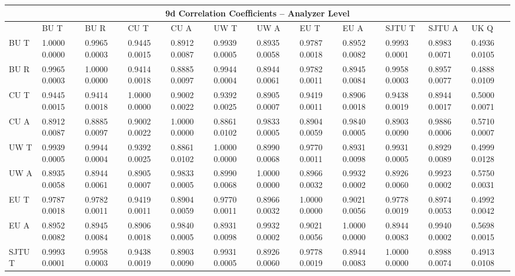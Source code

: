 \begin{landscape}
\begin{table}
\small
\centering
\renewcommand{\arraystretch}{1.5}
\begin{tabularx}{1\linewidth}{@{\extracolsep{\fill}}lXXXXXXXXXXX}
  \toprule
  	\multicolumn{12}{c}{{\normalsize 9d Correlation Coefficients -- Analyzer Level}} \\
  \midrule
  	       & BU T & BU R & CU T & CU A & UW T & UW A & EU T & EU A & SJTU T & SJTU A & UK Q \\
  \midrule
	BU T   & 1.0000 0.0000 & 0.9965 0.0003 & 0.9445 0.0015 & 0.8912 0.0087 & 0.9939 0.0005 & 0.8935 0.0058 & 0.9787 0.0018 & 0.8952 0.0082 & 0.9993 0.0001 & 0.8983 0.0071 & 0.4936 0.0105  \\
	BU R   & 0.9965 0.0003 & 1.0000 0.0000 & 0.9414 0.0018 & 0.8885 0.0097 & 0.9944 0.0004 & 0.8944 0.0061 & 0.9782 0.0011 & 0.8945 0.0084 & 0.9958 0.0003 & 0.8957 0.0077 & 0.4888 0.0109  \\
	CU T   & 0.9445 0.0015 & 0.9414 0.0018 & 1.0000 0.0000 & 0.9002 0.0022 & 0.9392 0.0025 & 0.8905 0.0007 & 0.9419 0.0011 & 0.8906 0.0018 & 0.9438 0.0019 & 0.8944 0.0017 & 0.5000 0.0071  \\
	CU A   & 0.8912 0.0087 & 0.8885 0.0097 & 0.9002 0.0022 & 1.0000 0.0000 & 0.8861 0.0102 & 0.9833 0.0005 & 0.8904 0.0059 & 0.9840 0.0005 & 0.8903 0.0090 & 0.9886 0.0006 & 0.5710 0.0007  \\
	UW T   & 0.9939 0.0005 & 0.9944 0.0004 & 0.9392 0.0025 & 0.8861 0.0102 & 1.0000 0.0000 & 0.8990 0.0068 & 0.9770 0.0011 & 0.8931 0.0098 & 0.9931 0.0005 & 0.8929 0.0089 & 0.4999 0.0128  \\
	UW A   & 0.8935 0.0058 & 0.8944 0.0061 & 0.8905 0.0007 & 0.9833 0.0005 & 0.8990 0.0068 & 1.0000 0.0000 & 0.8966 0.0032 & 0.9932 0.0002 & 0.8926 0.0060 & 0.9923 0.0002 & 0.5750 0.0031  \\
	EU T   & 0.9787 0.0018 & 0.9782 0.0011 & 0.9419 0.0011 & 0.8904 0.0059 & 0.9770 0.0011 & 0.8966 0.0032 & 1.0000 0.0000 & 0.9021 0.0056 & 0.9778 0.0019 & 0.8974 0.0053 & 0.4992 0.0042  \\
	EU A   & 0.8952 0.0082 & 0.8945 0.0084 & 0.8906 0.0018 & 0.9840 0.0005 & 0.8931 0.0098 & 0.9932 0.0002 & 0.9021 0.0056 & 1.0000 0.0000 & 0.8944 0.0083 & 0.9940 0.0002 & 0.5698 0.0015  \\
	SJTU T & 0.9993 0.0001 & 0.9958 0.0003 & 0.9438 0.0019 & 0.8903 0.0090 & 0.9931 0.0005 & 0.8926 0.0060 & 0.9778 0.0019 & 0.8944 0.0083 & 1.0000 0.0000 & 0.8988 0.0074 & 0.4913 0.0108  \\

\end{tabularx}
\end{table}
\end{landscape}
